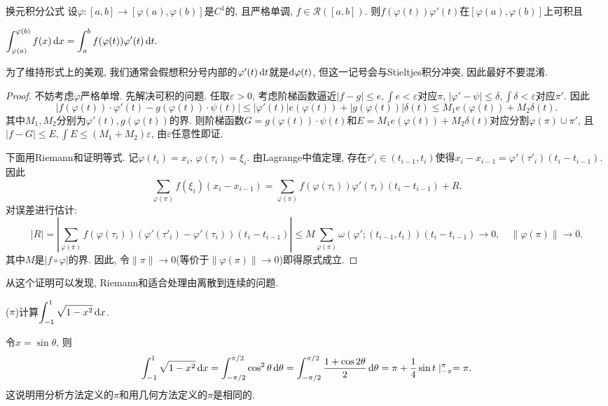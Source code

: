 \begin{proposition}{换元积分公式} \label{pro:hryrjiff}
	设$\varphi :[a,b] \to [\varphi (a), \varphi (b)]$是$C^1$的, 且严格单调, $f \in \mathcal{R}([a,b])$. 则$f(\varphi (t)) \varphi '(t)$在$[\varphi (a), \varphi (b)]$上可积且
	\begin{center}
		$\displaystyle \int_{\varphi (a)}^{\varphi (b)} f(x) \mathop{}\!\mathrm{d} x = \int_a^b f(\varphi (t)) \varphi ' (t) \mathop{}\!\mathrm{d} t.$
	\end{center}
\end{proposition}
\begin{remark}
	为了维持形式上的美观, 我们通常会假想积分号内部的$\varphi ' (t) \mathop{}\!\mathrm{d} t$就是$\mathop{}\!\mathrm{d} \varphi (t)$, 但这一记号会与Stieltjes积分冲突, 因此最好不要混淆. 
\end{remark}
\begin{proof}
	不妨考虑$\varphi$严格单增. 先解决可积的问题. 任取$\varepsilon >0$, 考虑阶梯函数逼近$|f-g| \leq e ,\int e <\varepsilon$对应$\pi$, $|\varphi '-\psi| \leq \delta ,\int \delta < \varepsilon$对应$\pi '$. 因此$$|f(\varphi (t)) \cdot \varphi '(t) - g(\varphi (t)) \cdot \psi (t)| \leq |\varphi '(t)| e(\varphi (t)) + |g(\varphi (t))| \delta (t) \leq M_1e(\varphi (t)) + M_2 \delta (t).$$
	其中$M_1,M_2$分别为$\varphi '(t),g(\varphi (t))$的界. 则阶梯函数$G=g(\varphi (t)) \cdot \psi (t)$和$E=M_1e(\varphi (t)) + M_2 \delta (t)$对应分割$\varphi (\pi) \cup \pi '$, 且$|f-G| \leq E, \int E \leq (M_1+M_2)\varepsilon$, 由$\varepsilon$任意性即证. 
	
	下面用Riemann和证明等式. 记$\varphi (t_i)=x_i$, $\varphi (\tau _i)=\xi _i$. 由Lagrange中值定理, 存在$\tau ' _i \in (t_{i-1},t_i)$使得$x_i-x_{i-1}=\varphi '(\tau ' _i) (t_i-t_{i-1})$. 因此$$\sum_{\varphi (\pi)} f(\xi _i) (x_i-x_{i-1}) = \sum_{\varphi (\pi)} f(\varphi ( \tau _i )) \varphi '(\tau _i) (t_i-t_{i-1}) + R. $$
	对误差进行估计: $$|R | = \left|\sum_{\varphi (\pi)} f(\varphi ( \tau _i )) (\varphi '(\tau ' _i)-\varphi '(\tau _i)) (t_i-t_{i-1}) \right| \leq M \sum_{\varphi (\pi)}  \omega (\varphi ';(t_{i-1},t_i)) (t_i-t_{i-1}) \to 0, \quad \| \varphi (\pi) \| \to 0.$$
	其中$M$是$|f \circ \varphi|$的界. 因此, 令$\| \pi \|\to 0$(等价于$\| \varphi (\pi) \| \to 0$)即得原式成立. 
\end{proof}
\begin{remark}
	 从这个证明可以发现, Riemann和适合处理由离散到连续的问题. 
\end{remark}

\begin{example}
	($\pi$)计算$\displaystyle \int_{-1}^{1} \sqrt{1-x^2} \mathop{}\!\mathrm{d} x$. 
\end{example}
\begin{solution}
	令$x=\sin \theta$, 则$$\int_{-1}^{1} \sqrt{1-x^2} \mathop{}\!\mathrm{d} x = \int_{-\pi /2}^{\pi /2} \cos ^2 \theta \mathop{}\!\mathrm{d} \theta = \int_{-\pi /2}^{\pi /2} \frac{1+\cos 2\theta}{2} \mathop{}\!\mathrm{d} \theta = \pi + \frac{1}{4} \sin t\mid _{-\pi}^{\pi} = \pi .$$
	这说明用分析方法定义的$\pi$和用几何方法定义的$\pi$是相同的. 
\end{solution}


